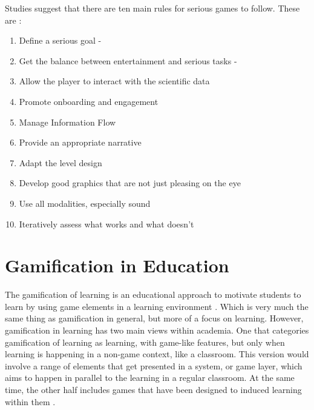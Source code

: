 		Studies suggest that there are ten main rules for serious games to follow. These are \cite{10seriousrules}:
		\begin{enumerate}		
			\item Define a serious goal - 
			\item Get the balance between entertainment and serious tasks -
			\item Allow the player to interact with the scientific data
			\item Promote onboarding and engagement
			\item Manage Information Flow
			\item Provide an appropriate narrative
			\item Adapt the level design
			\item Develop good graphics that are not just pleasing on the eye
			\item Use all modalities, especially sound
			\item Iteratively assess what works and what doesn't
		\end{enumerate}
	
	\section{Gamification in Education}
		\label{sec:gamification_edu}
		The gamification of learning is an educational approach to motivate students to learn by using game elements in a learning environment \cite{gamelearning}. Which is very much the same thing as gamification in general, but more of a focus on learning. However, gamification in learning has two main views within academia. One that categories gamification of learning as learning, with game-like features, but only when learning is happening in a non-game context, like a classroom. This version would involve a range of elements that get presented in a system, or game layer, which aims to happen in parallel to the learning in a regular classroom. At the same time, the other half includes games that have been designed to induced learning within them \cite{gamelearning}.

